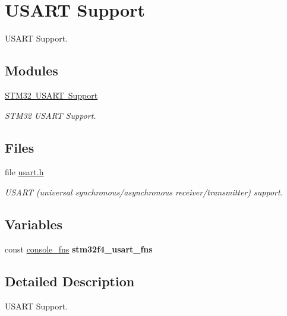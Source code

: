\hypertarget{group__stm32f4__usart}{}\section{U\+S\+A\+RT Support}
\label{group__stm32f4__usart}


U\+S\+A\+RT Support.  


\subsection*{Modules}
\begin{DoxyCompactItemize}
\item 
\mbox{\hyperlink{group__stm32__usart}{S\+T\+M32 U\+S\+A\+R\+T Support}}
\begin{DoxyCompactList}\small\item\em S\+T\+M32 U\+S\+A\+RT Support. \end{DoxyCompactList}\end{DoxyCompactItemize}
\subsection*{Files}
\begin{DoxyCompactItemize}
\item 
file \mbox{\hyperlink{stm32f4_2include_2bsp_2usart_8h}{usart.\+h}}
\begin{DoxyCompactList}\small\item\em U\+S\+A\+RT (universal synchronous/asynchronous receiver/transmitter) support. \end{DoxyCompactList}\end{DoxyCompactItemize}
\subsection*{Variables}
\begin{DoxyCompactItemize}
\item 
\mbox{\label{group__stm32f4__usart_ga15cac9aad721aeabdbcdf876ec9a3cfe}} 
const \mbox{\hyperlink{struct__console__fns}{console\+\_\+fns}} {\bfseries stm32f4\+\_\+usart\+\_\+fns}
\end{DoxyCompactItemize}


\subsection{Detailed Description}
U\+S\+A\+RT Support. 

